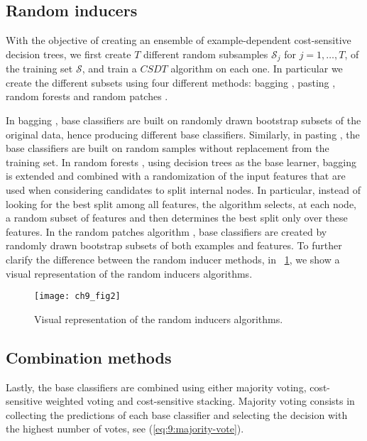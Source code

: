 {\subsection{Random inducers}

With the objective of creating an ensemble of example-dependent cost-sensitive decision trees, we 
first create $T$ different random subsamples $\mathcal{S}_j$ for $j=1,\dots,T$, of the training  
set 
$\mathcal{S}$, and train a $CSDT$ algorithm on each one. In particular we create the different 
subsets using four different methods: bagging \citep{Breiman1996}, pasting \citep{Breiman1999}, 
random forests \citep{Breiman2001} and random patches \citep{Louppe2012}. 

In bagging \citep{Breiman1996}, base classifiers are built on randomly drawn bootstrap subsets of 
the original data, hence producing different base classifiers. Similarly, in pasting 
\citep{Breiman1999}, the base classifiers are built on random  samples without replacement from 
the training set. In random forests \citep{Breiman2001}, using decision trees as the base learner, 
bagging   is extended and   combined  with a  randomization of the input features that  are used 
when  considering candidates  to split    internal nodes. In particular, instead of looking for  
the best  split among all   features, the   algorithm selects, at each node, a random subset of 
features  and then determines   the best split only over  these features. In the random patches   
algorithm \citep{Louppe2012}, base classifiers are created by randomly     drawn bootstrap subsets 
of both examples and features. To further clarify the difference between the random inducer 
methods, in \figurename{~\ref{fig:9:2}}, we show a visual representation of the random inducers 
algorithms.
 
\begin{figure}[t!]
\centering
\texttt{[image: ch9\_fig2]}
\caption{Visual representation of the random inducers algorithms.}
\label{fig:9:2}
\end{figure} 


\subsection{Combination methods}

Lastly, the base classifiers are combined using either majority voting, cost-sensitive weighted 
voting and cost-sensitive stacking. Majority voting consists in collecting the predictions of 
each base classifier and selecting the decision with the highest number of votes, see 
(\ref{eq:9:majority-vote}).

}
